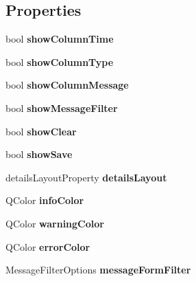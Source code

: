 \subsection*{Properties}
\begin{DoxyCompactItemize}
\item 
\hypertarget{classQELog_a499bb8355e2d19ec8ddb444752063b25}{
bool {\bfseries showColumnTime}}
\label{classQELog_a499bb8355e2d19ec8ddb444752063b25}

\item 
\hypertarget{classQELog_a4a9a0fb2694c019229bb94d9989bcd91}{
bool {\bfseries showColumnType}}
\label{classQELog_a4a9a0fb2694c019229bb94d9989bcd91}

\item 
\hypertarget{classQELog_ae74260abd3ea8861f0c6247eb1cfc65a}{
bool {\bfseries showColumnMessage}}
\label{classQELog_ae74260abd3ea8861f0c6247eb1cfc65a}

\item 
\hypertarget{classQELog_a8058526fed5816228e6bc81413b18cbf}{
bool {\bfseries showMessageFilter}}
\label{classQELog_a8058526fed5816228e6bc81413b18cbf}

\item 
\hypertarget{classQELog_a935a49a585c6cf41bf0b89a96a46f9f1}{
bool {\bfseries showClear}}
\label{classQELog_a935a49a585c6cf41bf0b89a96a46f9f1}

\item 
\hypertarget{classQELog_a67f5ae906b00e94c29b6915ceb4ce917}{
bool {\bfseries showSave}}
\label{classQELog_a67f5ae906b00e94c29b6915ceb4ce917}

\item 
\hypertarget{classQELog_af691c12d13564e2005a85d9054273aef}{
detailsLayoutProperty {\bfseries detailsLayout}}
\label{classQELog_af691c12d13564e2005a85d9054273aef}

\item 
\hypertarget{classQELog_a78bee8686487eaa81b562f45ad9d8f66}{
QColor {\bfseries infoColor}}
\label{classQELog_a78bee8686487eaa81b562f45ad9d8f66}

\item 
\hypertarget{classQELog_af14bb056d0e7cde60aba32b981ece445}{
QColor {\bfseries warningColor}}
\label{classQELog_af14bb056d0e7cde60aba32b981ece445}

\item 
\hypertarget{classQELog_af533b34ae4bab45db273a90223367725}{
QColor {\bfseries errorColor}}
\label{classQELog_af533b34ae4bab45db273a90223367725}

\item 
\hypertarget{classQELog_a63f3310fe80511374cb4028a0124e96c}{
MessageFilterOptions {\bfseries messageFormFilter}}
\label{classQELog_a63f3310fe80511374cb4028a0124e96c}


\end{DoxyCompactItemize}
